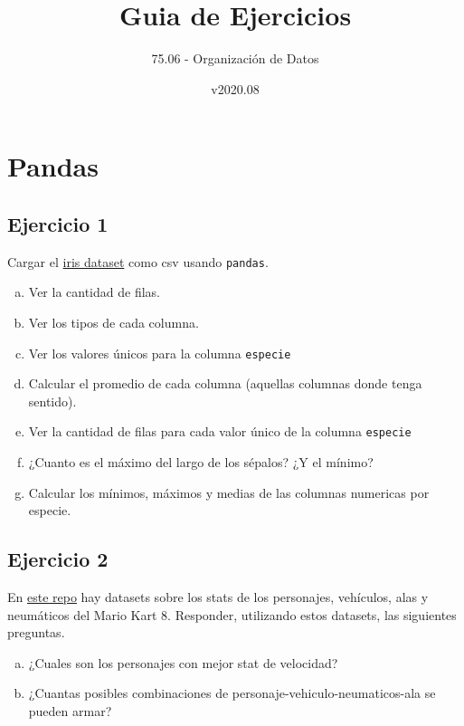 \documentclass{report}
\title{Guia de Ejercicios}
\author{75.06 - Organización de Datos}
\date{v2020.08}
\begin{document}
\maketitle

\tableofcontents{}

\chapter{Pandas}

\section{Ejercicio 1}
Cargar el \href{https://gist.githubusercontent.com/CrossNox/6ea7fedb55bfb511449ba67d47d8e071/raw/3158919a26833fc8f2f3170b0e8a4d6f6cf09b8e/iris.csv}{iris dataset} como csv usando \texttt{pandas}.

\begin{enumerate}[a)]
\item Ver la cantidad de filas.
\item Ver los tipos de cada columna.
\item Ver los valores únicos para la columna \texttt{especie}
\item Calcular el promedio de cada columna (aquellas columnas donde tenga sentido).
\item Ver la cantidad de filas para cada valor único de la columna \texttt{especie}
\item ¿Cuanto es el máximo del largo de los sépalos? ¿Y el mínimo?
\item Calcular los mínimos, máximos y medias de las columnas numericas por especie.
\end{enumerate}

\section{Ejercicio 2}
En \href{https://github.com/woodnathan/MarioKart8-Stats}{este repo} hay datasets sobre los stats de los personajes, vehículos, alas y neumáticos del Mario Kart 8. Responder, utilizando estos datasets, las siguientes preguntas.

\begin{enumerate}[a)]
\item ¿Cuales son los personajes con mejor stat de velocidad?
\item ¿Cuantas posibles combinaciones de personaje-vehiculo-neumaticos-ala se pueden armar?
\end{enumerate}
\end{document}

